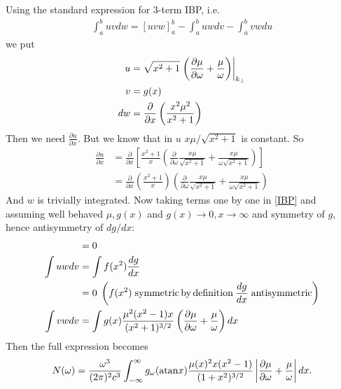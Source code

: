 \documentclass[]{article}
\begin{document}
Using the standard expression for 3-term IBP, i.e.
\begin{align}\label{IBP}
\int_a^b u v dw = [uvw]_a^b - \int_a^b uw dv - \int_a^b vw du
\end{align} we put
\begin{align}
u&= \sqrt{x^2 +1} \left.\left( \frac{\partial \mu}{\partial \omega} + \frac {\mu}{\omega}\right) \right|_{k_\perp}\\
v&=g(x)\\
dw &= \frac{\partial}{\partial x}\left(\frac{x^2 \mu^2}{x^2 +1}\right)
\end{align}
Then we need $\frac{\partial u}{\partial x}$. But we know that in $u$ $ x \mu / \sqrt{x^2 +1}$ is constant. So
\begin{align}
\frac{\partial u}{\partial x} &= \frac{\partial}{\partial x} \left[ \frac{x^2+1}{x} \left( \frac{\partial}{\partial \omega} \frac{x \mu}{\sqrt{x^2+1}}  + \frac{x \mu}{\omega\sqrt{x^2+1}} \right)\right]\\
&=\frac{\partial}{\partial x} \left(\frac{x^2+1}{x} \right) \left( \frac{\partial}{\partial \omega} \frac{x \mu}{\sqrt{x^2+1}}  + \frac{x \mu}{\omega\sqrt{x^2+1}} \right)
\end{align}
And $w$ is trivially integrated.
Now taking terms one by one in \ref{IBP} and assuming well behaved $\mu, g(x)$ and $g(x)\rightarrow 0, x\rightarrow \infty$ and symmetry of $g$, hence antisymmetry of $dg/dx$:
\begin{align}
[uvw] &= 0 \\
\int u w dv &= \int f(x^2) \frac{dg}{dx}\notag\\
&= 0 \; \left(f(x^2) \;\mathrm{symmetric \,by\, definition}\: \frac{dg}{dx} \;\mathrm{antisymmetric}\right)\\
\int vw dv &= \int g(x) \frac{\mu^2 (x^2-1) x}{(x^2 +1)^{3/2}} \left( \frac{\partial \mu}{\partial \omega} + \frac{ \mu}{\omega} \right)  d x
\end{align}
Then the full expression becomes \begin{equation}\label{N_IBP}
N(\omega) = \frac{\omega^3}{(2\pi)^2 c^3} \int_{-\infty}^\infty g_\omega( \mathrm{atan} x ) 
 \frac{\mu(x)^2 x (x^2-1)}{(1+x^2)^{3/2}}
 \left| \frac{\partial \mu}{\partial \omega} + \frac {\mu}{\omega}\right|
 d x .
\end{equation}
\end{document}
